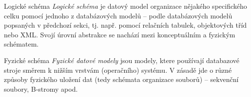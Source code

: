 \begin{obecne}{Logické schéma}
\emph{Logické schéma} je datový model organizace nějakého specifického celku pomocí jednoho z databázových modelů -- podle databázových modelů popsaných v předchozí sekci, tj. např. pomocí relačních tabulek, objektových tříd nebo XML. Svojí úrovní abstrakce se nachází mezi konceptuálním a fyzickým schématem.
\end{obecne}

\begin{obecne}{Fyzické schéma}
\emph{Fyzické datové modely} jsou modely, ktere používají databazové stroje směrem k nižším vrstvám (operačního) systému. V zásadě jde o různé způsoby fyzického uložení dat (tedy schémata organizace souborů) -- sekvenční soubory, B-stromy apod.
\end{obecne}

